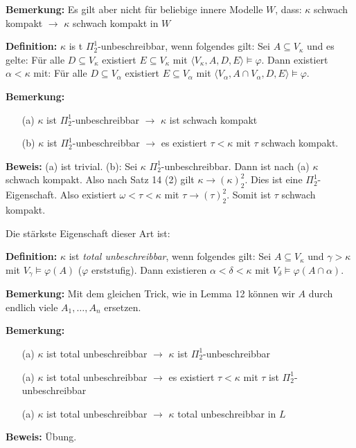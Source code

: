\documentclass[a4paper,fontsize=11pt]{scrartcl}
\begin{document}
{\bf Bemerkung:} Es gilt aber nicht für beliebige innere Modelle $W$, dass: 
  $\kappa$ schwach kompakt $\to$ $\kappa$ schwach kompakt in $W$

{\bf Definition:} $\kappa$ is t $\Pi^1_2$-unbeschreibbar, wenn folgendes gilt:
  Sei $A\subseteq V_{\kappa}$ und es gelte:
  Für alle $D\subseteq V_{\kappa}$ existiert $E\subseteq V_{\kappa}$ mit $\langle V_{\kappa},A,D,E\rangle \models \varphi$.
  Dann existiert $\alpha<\kappa$ mit: 
  Für alle $D\subseteq V_{\alpha}$ existiert $E\subseteq V_{\alpha}$ mit $\langle V_{\alpha}, A\cap V_{\alpha},D,E\rangle \models\varphi$.
  
{\bf Bemerkung:} \begin{enumerate}
    \item[(a)] $\kappa$ ist $\Pi^1_2$-unbeschreibbar $\to$ $\kappa$ ist schwach kompakt
    \item[(b)] $\kappa$ ist $\Pi^1_2$-unbeschreibbar $\to$ es existiert $\tau<\kappa$ mit $\tau$ schwach kompakt.
  \end{enumerate}
  
  {\bf Beweis:} (a) ist trivial. 
    (b): Sei $\kappa$ $\Pi^1_2$-unbeschreibbar.
    Dann ist nach (a) $\kappa$ schwach kompakt. 
    Also nach Satz 14 (2) gilt $\kappa\to (\kappa)^2_2$.
    Dies ist eine $\Pi^1_2$-Eigenschaft.
    Also existiert $\omega<\tau<\kappa$ mit $\tau \to (\tau)^2_2$.
    Somit ist $\tau$ schwach kompakt.

Die stärkste Eigenschaft dieser Art ist:

{\bf Definition:} $\kappa$ ist \emph{total unbeschreibbar}, wenn folgendes gilt: 
  Sei $A\subseteq V_{\kappa}$ und $\gamma>\kappa$ mit $V_{\gamma}\models \varphi(A)$ ($\varphi$ erststufig).
  Dann existieren $\alpha<\delta<\kappa$ mit $V_{\delta} \models \varphi(A\cap\alpha)$.
  
{\bf Bemerkung:} Mit dem gleichen Trick, wie in Lemma 12 können wir $A$ durch endlich viele $A_1,\ldots,A_n$ ersetzen.

{\bf Bemerkung:} \begin{enumerate}
    \item[(a)] $\kappa$ ist total unbeschreibbar $\to$ $\kappa$ ist $\Pi^1_2$-unbeschreibbar
    \item[(a)] $\kappa$ ist total unbeschreibbar $\to$ es existiert $\tau<\kappa$ mit $\tau$ ist $\Pi^1_2$-unbeschreibbar
    \item[(a)] $\kappa$ ist total unbeschreibbar $\to$ $\kappa$ total unbeschreibbar in $L$
  \end{enumerate}
  {\bf Beweis:} Übung. %
  
\end{document}
